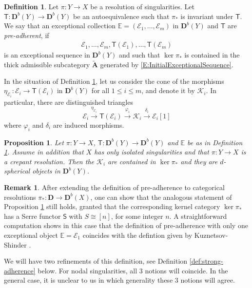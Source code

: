 \documentclass[a4paper,11pt, reqno]{amsart}
\def\E{\mathbb E}
\def\AA{\mathbf A}
\def\DD{\mathbf D}
\def\sE{\mathscr{E}}
\def\sK{\mathscr{K}}
\def\Db{\DD^b}
\newcommand{\bS}{\mathsf{S}}
\newcommand{\bT}{\mathsf{T}}
\theoremstyle{plain}
\newtheorem{proposition}[dummy]{Proposition}
\theoremstyle{definition}
\newtheorem{definition}[dummy]{Definition}
\newtheorem{remark}[dummy]{Remark}
\numberwithin{equation}{section}
\newlength{\arrow}
\begin{document}
\begin{definition}\label{def:adherence}
    Let $\pi : Y  \to X$ be a resolution of singularities. Let $\bT : \Db(Y) \to \Db(Y) $ be an autoequivalence such that $\pi_\ast$ is invariant under $\bT$.
    We say that an exceptional collection $\E = ( \sE_1 , \ldots , \sE_m )$ in $\Db(Y)$ and $\bT$ are \emph{pre-adherent}, if 
\begin{align}\label{E:InitialExceptionalSequence}
\sE_1, \ldots, \sE_m, \bT( \sE_1 ), \ldots, \bT( \sE_m ) 
\end{align}
is an exceptional sequence in $\Db(Y)$ and such that $\ker \pi_\ast $ is contained in the thick admissible subcategory $\tilde{\AA}$ generated by \eqref{E:InitialExceptionalSequence}. 
\end{definition}
    
    In the situation of Definition \ref{def:adherence}, let us consider the cone of the morphisms $\eta_{\sE_i} \colon \sE_i\to \bT( \sE_i )$ in $\Db (Y)$ for all $1 \leq i \leq m$, and denote it by $\sK_i$.
    In particular, there are distinguished triangles
\begin{equation}\label{eq:main-distinguished-triangle}
    \sE_i \xrightarrow{\eta_{\sE_i} } \bT ( \sE_i  ) \xrightarrow{\varphi_i } \sK_i \xrightarrow{\delta_i} \sE_i [1]
\end{equation}
where $\varphi_i$ and $\delta_i$ are induced morphisms.
    
    \begin{proposition}\label{prop:sph-obj}
        Let $\pi : Y  \to X$, $\bT : \Db(Y) \to \Db(Y) $ and $\E$ be as in Definition \ref{def:adherence}.
        Assume in addition that $X$ has only isolated singularities and that  $\pi : Y \to X$ is a crepant resolution.
        Then the $\sK_i$ are contained in $\ker \pi_\ast$ and they are $d$-spherical objects in $\Db(Y)$.
    \end{proposition}

\begin{remark}\label{rmk:adherence-old-def}
After extending the definition of pre-adherence to categorical resolutions $\pi_\ast \colon \DD \to \Db(X)$, 
one can show that the analogous statement of Proposition \ref{prop:sph-obj} still holds, granted that the corresponding kernel category $\ker \pi_\ast$ has a Serre functor $\bS$ with $S \cong [n]$, for some integer $n$.
A straightforward computation shows in this case that the definition of pre-adherence with only one exceptional object $\E = \sE_1$ coincides with the defintion given by Kuznetsov-Shinder \cite[Definition 3.9]{ks}.

We will have two refinements of this definition, see Definition \ref{def:strong-adherence} below.
For nodal singularities, all $3$ notions will coincide.
In the general case, it is unclear to us in which generality these $3$ notions will agree.
\end{remark}
\end{document}
